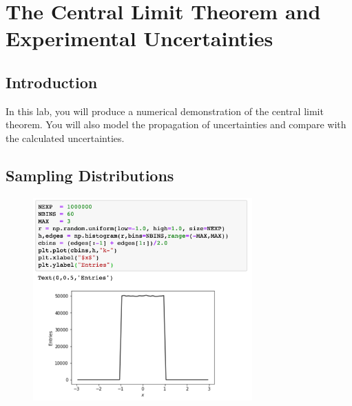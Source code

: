\chapter{The Central Limit Theorem and Experimental Uncertainties}

%
%

\section{Introduction}

In this lab, you will produce a numerical demonstration of the central
limit theorem.  You will also model the propagation of uncertainties
and compare with the calculated uncertainties.


\section{Sampling Distributions}

\begin{figure}[htbp]
\begin{center}
\includegraphics[width=0.75\textwidth]{figs/labs/uncertainties/step.png}\\
\end{center}
\caption{\label{fig:samplingstep}}
\end{figure}

